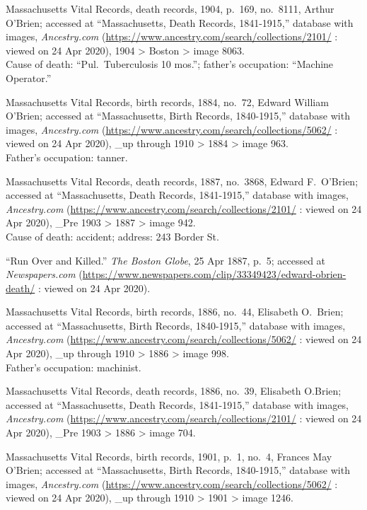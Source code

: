 \begin{thebibliography}{999}
	Massachusetts Vital Records, death records, 1904, p.\ 169, no.\ 8111, Arthur O'Brien; accessed at ``Massachusetts, Death Records, 1841-1915,'' database with images, \textit{Ancestry.com} (\url{https://www.ancestry.com/search/collections/2101/} : viewed on 24 Apr 2020), 1904 > Boston > image 8063.\\
	Cause of death: ``Pul.\ Tuberculosis 10 mos.''; father's occupation: ``Machine Operator.''
	
	Massachusetts Vital Records, birth records, 1884, no.\ 72, Edward William O'Brien; accessed at ``Massachusetts, Birth Records, 1840-1915,'' database with images, \textit{Ancestry.com} (\url{https://www.ancestry.com/search/collections/5062/} : viewed on 24 Apr 2020), \_up through 1910 > 1884 > image 963.\\
	Father's occupation: tanner.
	
	Massachusetts Vital Records, death records, 1887, no.\ 3868, Edward F.\ O'Brien; accessed at ``Massachusetts, Death Records, 1841-1915,'' database with images, \textit{Ancestry.com} (\url{https://www.ancestry.com/search/collections/2101/} : viewed on 24 Apr 2020), \_Pre 1903 > 1887 > image 942.\\
	Cause of death: accident; address: 243 Border St.
	
	``Run Over and Killed.'' \textit{The Boston Globe}, 25 Apr 1887, p.\ 5; accessed at \textit{Newspapers.com} (\url{https://www.newspapers.com/clip/33349423/edward-obrien-death/} : viewed on 24 Apr 2020).
	
	Massachusetts Vital Records, birth records, 1886, no.\ 44, Elisabeth O.\ Brien; accessed at ``Massachusetts, Birth Records, 1840-1915,'' database with images, \textit{Ancestry.com} (\url{https://www.ancestry.com/search/collections/5062/} : viewed on 24 Apr 2020), \_up through 1910 > 1886 > image 998.\\
	Father's occupation: machinist.
	
	Massachusetts Vital Records, death records, 1886, no.\ 39, Elisabeth O.Brien; accessed at ``Massachusetts, Death Records, 1841-1915,'' database with images, \textit{Ancestry.com} (\url{https://www.ancestry.com/search/collections/2101/} : viewed on 24 Apr 2020), \_Pre 1903 > 1886 > image 704.	
	
	Massachusetts Vital Records, birth records, 1901, p.\ 1, no.\ 4, Frances May O'Brien; accessed at ``Massachusetts, Birth Records, 1840-1915,'' database with images, \textit{Ancestry.com} (\url{https://www.ancestry.com/search/collections/5062/} : viewed on 24 Apr 2020), \_up through 1910 > 1901 > image 1246.
	

\end{thebibliography}
